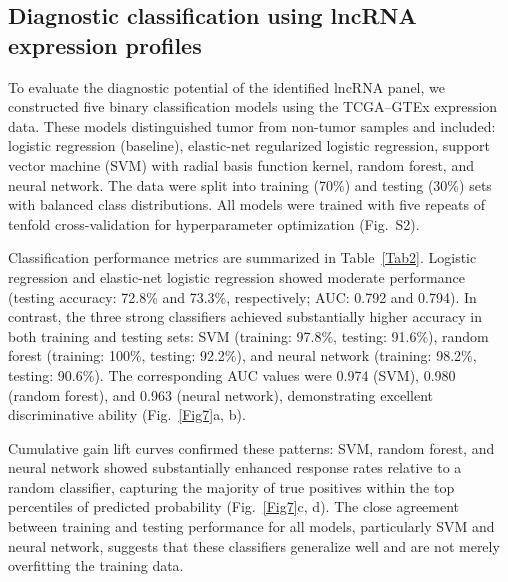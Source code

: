 \documentclass[fleqn,10pt]{wlscirep}
\begin{document}
\subsection*{Diagnostic classification using lncRNA expression profiles}

To evaluate the diagnostic potential of the identified lncRNA panel, we constructed five binary classification models using the TCGA--GTEx expression data. These models distinguished tumor from non-tumor samples and included: logistic regression (baseline), elastic-net regularized logistic regression, support vector machine (SVM) with radial basis function kernel, random forest, and neural network. The data were split into training (70\%) and testing (30\%) sets with balanced class distributions. All models were trained with five repeats of tenfold cross-validation for hyperparameter optimization (Fig.~S2).

Classification performance metrics are summarized in Table~\ref{Tab2}. Logistic regression and elastic-net logistic regression showed moderate performance (testing accuracy: 72.8\% and 73.3\%, respectively; AUC: 0.792 and 0.794). In contrast, the three strong classifiers achieved substantially higher accuracy in both training and testing sets: SVM (training: 97.8\%, testing: 91.6\%), random forest (training: 100\%, testing: 92.2\%), and neural network (training: 98.2\%, testing: 90.6\%). The corresponding AUC values were 0.974 (SVM), 0.980 (random forest), and 0.963 (neural network), demonstrating excellent discriminative ability (Fig.~\ref{Fig7}a, b).

Cumulative gain lift curves confirmed these patterns: SVM, random forest, and neural network showed substantially enhanced response rates relative to a random classifier, capturing the majority of true positives within the top percentiles of predicted probability (Fig.~\ref{Fig7}c, d). The close agreement between training and testing performance for all models, particularly SVM and neural network, suggests that these classifiers generalize well and are not merely overfitting the training data.
\end{document}
